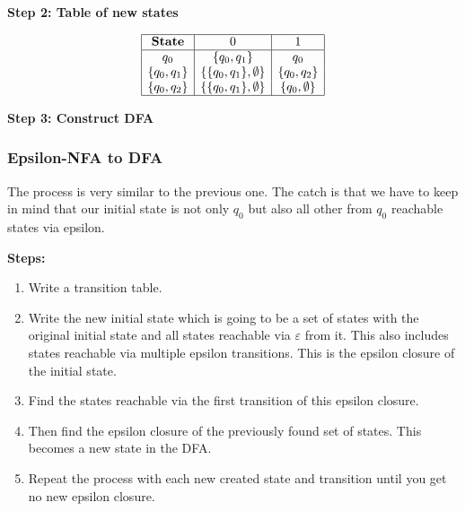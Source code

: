 \textbf{Step 2: Table of new states}

\[
    \begin{array}{|c|c|c|}
    \hline
    \textbf{State} & 0              & 1    \\
    \hline
    q_0            & \{q_0, q_1\} & q_0  \\
    \{q_0, q_1\}   & \{\{q_0, q_1\}, \emptyset \} & \{q_0, q_2\}  \\
    \{q_0, q_2\}   & \{\{q_0, q_1\}, \emptyset \} &  \{q_0, \emptyset \}\\
    \hline
    \end{array}
\]

\textbf{Step 3: Construct DFA}

\begin{center}
\end{center}

\subsubsection{Epsilon-NFA to DFA}

The process is very similar to the previous one. The catch is that we have to keep in mind that 
our initial state is not only \(q_0\) but also all other from \(q_0\) reachable states via epsilon.

\textbf{Steps:}

\begin{enumerate}
    
    \item Write a transition table.
    
    \item Write the new initial state which is going to be a set of states with the 
          original initial state and all states reachable via \(\varepsilon\) from it. This 
          also includes states reachable via multiple epsilon transitions. 
          This is the epsilon closure of the initial state.

    \item Find the states reachable via the first transition of this epsilon closure.
    
    \item Then find the epsilon closure of the previously found set of states. This becomes a new state 
          in the DFA.  

    \item Repeat the process with each new created state and transition until you get no new epsilon 
          closure.

\end{enumerate}


